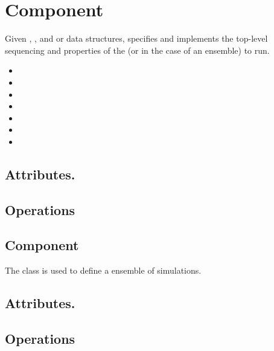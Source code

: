 \section{ Component} \label{s:component-simulation}

Given , , and  or
 data structures, specifies and implements the
top-level sequencing and properties of the  (or
 in the case of an ensemble) to run.

\begin{itemize}
\item {}
\item {}
\item {}
\item {}
\item {}
\item {}
\item {}
\end{itemize}

\subsection{Attributes.}

\subsection{Operations}

\subsection{ Component} \label{s:component-ensemble}

The  class is used to define a ensemble of simulations.  

\subsection{Attributes.}

\subsection{Operations}



